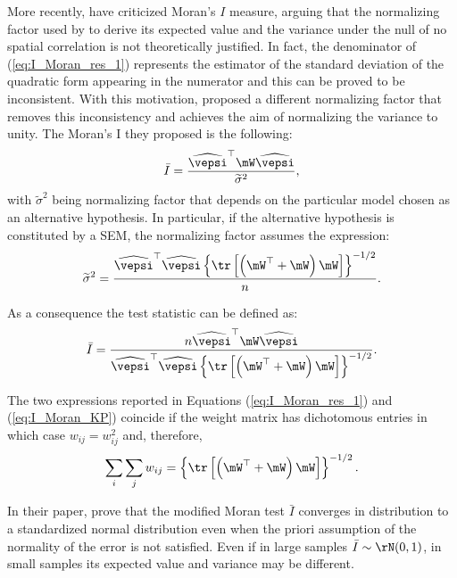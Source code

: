 \documentclass[english,12pt]{book}\usepackage[]{graphicx}\usepackage[]{xcolor}
\begin{document}
More recently, \cite{kelejian2001asymptotic} have criticized Moran's $I$  measure, arguing that the normalizing factor used by \cite{cliff1972testing} to derive its expected value and the variance under the null of no spatial correlation is not theoretically justified. In fact, the denominator of  (\ref{eq:I_Moran_res_1}) represents the estimator of the standard deviation of the quadratic form appearing in the numerator and this can be proved to be inconsistent. With this motivation, \cite{kelejian2001asymptotic} proposed a different normalizing factor that removes this inconsistency and achieves the aim of normalizing the variance to unity. The Moran's I they proposed is the following:
\begin{equation}
  \bar{I} = \frac{\widehat{\vepsi}^\top\mW\widehat{\vepsi}}{\widetilde{\sigma}^2},
\end{equation}
%
with $\widetilde{\sigma}^2$ being normalizing factor that depends on the particular model chosen as an alternative hypothesis. In particular, if the alternative hypothesis is constituted by a SEM, the normalizing factor assumes the expression:
\begin{equation*}
  \widetilde{\sigma}^2 = \frac{\widehat{\vepsi}^\top\widehat{\vepsi}\left\lbrace \tr \left[\left(\mW^\top + \mW\right)\mW\right]\right\rbrace^{-1/2}}{n}.
\end{equation*}

As a consequence the test statistic can be defined as:
\begin{equation}\label{eq:I_Moran_KP}
  \bar{I}= \frac{n\widehat{\vepsi}^\top\mW\widehat{\vepsi}}{\widehat{\vepsi}^\top\widehat{\vepsi}\left\lbrace \tr \left[\left(\mW^\top + \mW\right)\mW\right]\right\rbrace^{-1/2}}.
\end{equation}

The two expressions reported in Equations (\ref{eq:I_Moran_res_1}) and (\ref{eq:I_Moran_KP}) coincide if the weight matrix has dichotomous entries in which case $w_{ij} = w_{ij}^2$ and, therefore, 
\begin{equation*}
  \sum_i\sum_j w_{ij} = \left\lbrace \tr \left[\left(\mW^\top + \mW\right)\mW\right]\right\rbrace^{-1/2}.
\end{equation*}

In their paper,  \cite{kelejian2001asymptotic} prove that the modified Moran test $\bar{I}$ converges in distribution to a standardized normal distribution even when the priori assumption of the normality of the error is not satisfied. Even if in large samples $\bar{I}\sim \rN(0, 1)$, in small samples its expected value and variance may be different. 
\end{document}

